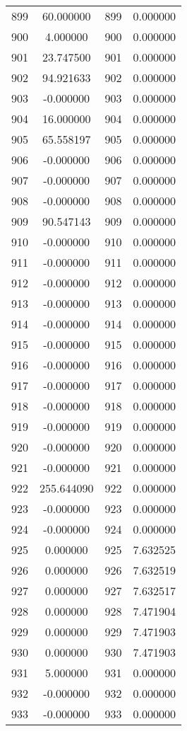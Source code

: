 \documentclass[12pt]{article}
\begin{document}
\begin{longtable}{@{}cccc@{}}
899 & 60.000000 & 899 & 0.000000 \\
900 & 4.000000 & 900 & 0.000000 \\
901 & 23.747500 & 901 & 0.000000 \\
902 & 94.921633 & 902 & 0.000000 \\
903 & -0.000000 & 903 & 0.000000 \\
904 & 16.000000 & 904 & 0.000000 \\
905 & 65.558197 & 905 & 0.000000 \\
906 & -0.000000 & 906 & 0.000000 \\
907 & -0.000000 & 907 & 0.000000 \\
908 & -0.000000 & 908 & 0.000000 \\
909 & 90.547143 & 909 & 0.000000 \\
910 & -0.000000 & 910 & 0.000000 \\
911 & -0.000000 & 911 & 0.000000 \\
912 & -0.000000 & 912 & 0.000000 \\
913 & -0.000000 & 913 & 0.000000 \\
914 & -0.000000 & 914 & 0.000000 \\
915 & -0.000000 & 915 & 0.000000 \\
916 & -0.000000 & 916 & 0.000000 \\
917 & -0.000000 & 917 & 0.000000 \\
918 & -0.000000 & 918 & 0.000000 \\
919 & -0.000000 & 919 & 0.000000 \\
920 & -0.000000 & 920 & 0.000000 \\
921 & -0.000000 & 921 & 0.000000 \\
922 & 255.644090 & 922 & 0.000000 \\
923 & -0.000000 & 923 & 0.000000 \\
924 & -0.000000 & 924 & 0.000000 \\
925 & 0.000000 & 925 & 7.632525 \\
926 & 0.000000 & 926 & 7.632519 \\
927 & 0.000000 & 927 & 7.632517 \\
928 & 0.000000 & 928 & 7.471904 \\
929 & 0.000000 & 929 & 7.471903 \\
930 & 0.000000 & 930 & 7.471903 \\
931 & 5.000000 & 931 & 0.000000 \\
932 & -0.000000 & 932 & 0.000000 \\
933 & -0.000000 & 933 & 0.000000 \\

\end{longtable}
\end{document}
